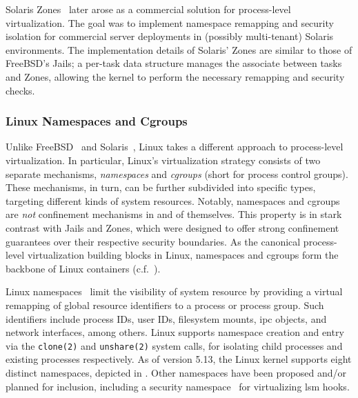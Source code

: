 Solaris Zones~\cite{price2004_zones} later arose as a commercial solution for
process-level virtualization. The goal was to implement namespace remapping and security
isolation for commercial server deployments in (possibly multi-tenant) Solaris
environments. The implementation details of Solaris' Zones are similar to those of
FreeBSD's Jails; a per-task data structure manages the associate between tasks and Zones,
allowing the kernel to perform the necessary remapping and security checks.

\subsubsection*{Linux Namespaces and Cgroups}

Unlike FreeBSD~\cite{kamp2000_jails} and Solaris~\cite{price2004_zones}, Linux takes
a different approach to process-level virtualization. In particular, Linux's
virtualization strategy consists of two separate mechanisms, \textit{namespaces} and
\textit{cgroups} (short for process control groups). These mechanisms, in turn, can be
further subdivided into specific types, targeting different kinds of system resources.
Notably, namespaces and cgroups are \textit{not} confinement mechanisms in and of
themselves. This property is in stark contrast with Jails and Zones, which were designed
to offer strong confinement guarantees over their respective security boundaries.
As the canonical process-level virtualization building blocks in Linux, namespaces and
cgroups form the backbone of Linux containers (c.f.\ ).

Linux namespaces~\cite{biederman2006_namespaces, linux_namespaces} limit the visibility of
system resource by providing a virtual remapping of global resource identifiers to
a process or process group. Such identifiers include process IDs, user IDs, filesystem
mounts, \gls{ipc} objects, and network interfaces, among others. Linux supports namespace
creation and entry via the \texttt{clone(2)} and \texttt{unshare(2)} system calls, for
isolating child processes and existing processes respectively. As of version 5.13, the
Linux kernel supports eight distinct namespaces, depicted in . Other
namespaces have been proposed and/or planned for inclusion, including a security
namespace~\cite{sun2018_security_namespace} for virtualizing \gls{lsm} hooks.

